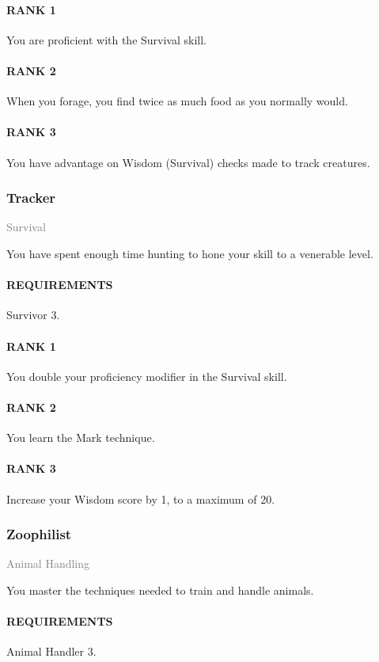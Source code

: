 \paragraph{RANK 1} You are proficient with the Survival skill.
\paragraph{RANK 2} When you forage, you find twice as much food as you normally would.
\paragraph{RANK 3} You have advantage on Wisdom (Survival) checks made to track creatures.

\subsubsection{Tracker} \label{feat::tracker}
\small{\textcolor{gray}{Survival}}

\normalsize
You have spent enough time hunting to hone your skill to a venerable level.
\paragraph{REQUIREMENTS} Survivor 3.
\paragraph{RANK 1} You double your proficiency modifier in the Survival skill.
\paragraph{RANK 2} You learn the Mark technique.
\paragraph{RANK 3} Increase your Wisdom score by 1, to a maximum of 20.

\subsubsection{Zoophilist} \label{feat::zoophilist}
\small{\textcolor{gray}{Animal Handling}}

\normalsize
You master the techniques needed to train and handle animals.
\paragraph{REQUIREMENTS} Animal Handler 3.
